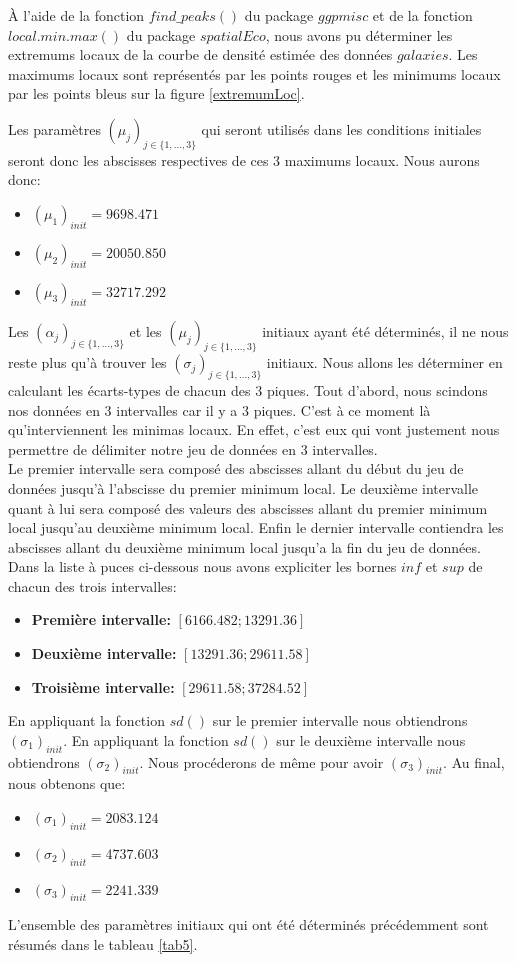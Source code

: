 \documentclass[a4paper,french,10pt]{article}
\begin{document}
À l'aide de la fonction $find\_peaks()$ du package $ggpmisc$ et de la fonction $local.min.max()$ du package $spatialEco$, nous avons pu déterminer les extremums locaux de la courbe de densité estimée des données $galaxies$. Les maximums locaux sont représentés par les points rouges et les minimums locaux par les points bleus sur la figure \ref{extremumLoc}.

\newpage

Les paramètres $(\mu_j)_{j \in \{1,\dots,3\}}$ qui seront utilisés dans les conditions initiales seront donc les abscisses respectives de ces 3 maximums locaux. Nous aurons donc:
\begin{itemize}
	\item $(\mu_1)_{init} = 9698.471$
	\item $(\mu_2)_{init} = 20050.850$
	\item $(\mu_3)_{init} = 32717.292$
\end{itemize}

\vspace{2mm}

Les $(\alpha_j)_{j \in \{1,\dots,3\}}$ et les $(\mu_j)_{j \in \{1,\dots,3\}}$ initiaux ayant été déterminés, il ne nous reste plus qu'à trouver les $(\sigma_j)_{j \in \{1,\dots,3\}}$ initiaux. Nous allons les déterminer en calculant les écarts-types de chacun des 3 piques. Tout d'abord, nous scindons nos données en 3 intervalles car il y a 3 piques. C'est à ce moment là qu'interviennent les minimas locaux. En effet, c'est eux qui vont justement nous permettre de délimiter notre jeu de données en 3 intervalles. \\
Le premier intervalle sera composé des abscisses allant du début du jeu de données jusqu'à l'abscisse du premier minimum local. Le deuxième intervalle quant à lui sera composé des valeurs des abscisses allant du premier minimum local jusqu'au deuxième minimum local. Enfin le dernier intervalle contiendra les abscisses allant du deuxième minimum local jusqu'a la fin du jeu de données. Dans la liste à puces ci-dessous nous avons expliciter les bornes $inf$ et $sup$ de chacun des trois intervalles:
\begin{itemize}
	\item \textbf{Première intervalle:} $[6166.482; 13291.36]$
	\item \textbf{Deuxième intervalle:} $[13291.36; 29611.58]$
	\item \textbf{Troisième intervalle:} $[29611.58; 37284.52]$
\end{itemize}
En appliquant la fonction $sd()$ sur le premier intervalle nous obtiendrons $(\sigma_1)_{init}$. En appliquant la fonction $sd()$ sur le deuxième intervalle nous obtiendrons $(\sigma_2)_{init}$. Nous procéderons de même pour avoir $(\sigma_3)_{init}$. Au final, nous obtenons que:
\begin{itemize}
	\item $(\sigma_1)_{init} = 2083.124$
	\item $(\sigma_2)_{init} = 4737.603$
	\item $(\sigma_3)_{init} = 2241.339$
\end{itemize}
L'ensemble des paramètres initiaux qui ont été déterminés précédemment sont résumés dans le tableau \ref{tab5}.
\end{document}
